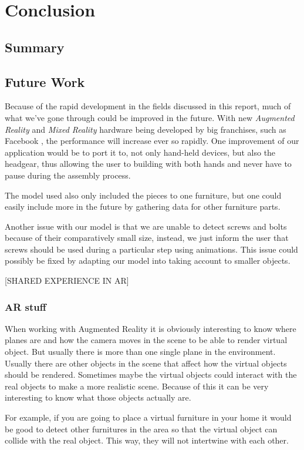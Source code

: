\section{Conclusion}

\subsection{Summary}

\subsection{Future Work}
Because of the rapid development in the fields discussed in this report, much of what we've gone through could be improved in the future. With new \textit{Augmented Reality} and \textit{Mixed Reality} hardware being developed by big franchises, such as Facebook \cite{facebookAR}, the performance will increase ever so rapidly. 
One improvement of our application would be to port it to, not only hand-held devices, but also the headgear, thus allowing the user to building with both hands and never have to pause during the assembly process. 

The model used also only included the pieces to one furniture, but one could easily include more in the future by gathering data for other furniture parts. 

Another issue with our model is that we are unable to detect screws and bolts because of their comparatively small size, instead, we just inform the user that screws should be used during a particular step using animations. This issue could possibly be fixed by adapting our model into taking account to smaller objects.

[SHARED EXPERIENCE IN AR]

\subsubsection{AR stuff}
When working with Augmented Reality it is obviously interesting to know where planes are and how the camera moves in the scene to be able to render virtual object. But usually there is more than one single plane in the environment. Usually there are other objects in the scene that affect how the virtual objects should be rendered. Sometimes maybe the virtual objects could interact with the real objects to make a more realistic scene. Because of this it can be very interesting to know what those objects actually are.

For example, if you are going to place a virtual furniture in your home it would be good to detect other furnitures in the area so that the virtual object can collide with the real object. This way, they will not intertwine with each other.

